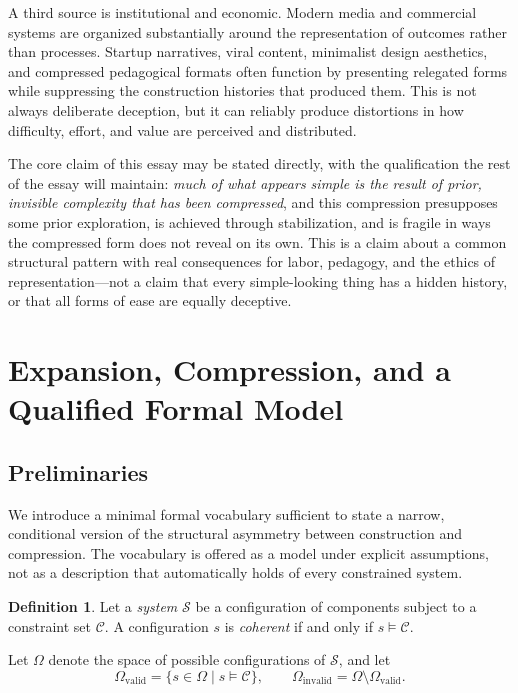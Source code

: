 \documentclass[12pt, a4paper]{article}
\theoremstyle{plain}
\theoremstyle{definition}
\newtheorem{definition}[proposition]{Definition}
\theoremstyle{remark}
\begin{document}
A third source is institutional and economic. Modern media and commercial systems are organized substantially around the representation of outcomes rather than processes. Startup narratives, viral content, minimalist design aesthetics, and compressed pedagogical formats often function by presenting relegated forms while suppressing the construction histories that produced them. This is not always deliberate deception, but it can reliably produce distortions in how difficulty, effort, and value are perceived and distributed.

The core claim of this essay may be stated directly, with the qualification the rest of the essay will maintain: \textit{much of what appears simple is the result of prior, invisible complexity that has been compressed}, and this compression presupposes some prior exploration, is achieved through stabilization, and is fragile in ways the compressed form does not reveal on its own. This is a claim about a common structural pattern with real consequences for labor, pedagogy, and the ethics of representation---not a claim that every simple-looking thing has a hidden history, or that all forms of ease are equally deceptive.

\section{Expansion, Compression, and a Qualified Formal Model}
\label{sec:formal}

\subsection{Preliminaries}
\label{subsec:preliminaries}

We introduce a minimal formal vocabulary sufficient to state a narrow, conditional version of the structural asymmetry between construction and compression. The vocabulary is offered as a model under explicit assumptions, not as a description that automatically holds of every constrained system.

\begin{definition}
Let a \emph{system} $\mathcal{S}$ be a configuration of components subject to a constraint set $\mathcal{C}$. A configuration $s$ is \emph{coherent} if and only if $s \models \mathcal{C}$.
\end{definition}

Let $\Omega$ denote the space of possible configurations of $\mathcal{S}$, and let
\[
\Omega_{\mathrm{valid}} = \{ s \in \Omega \mid s \models \mathcal{C} \}, \qquad \Omega_{\mathrm{invalid}} = \Omega \setminus \Omega_{\mathrm{valid}}.
\]
\end{document}
